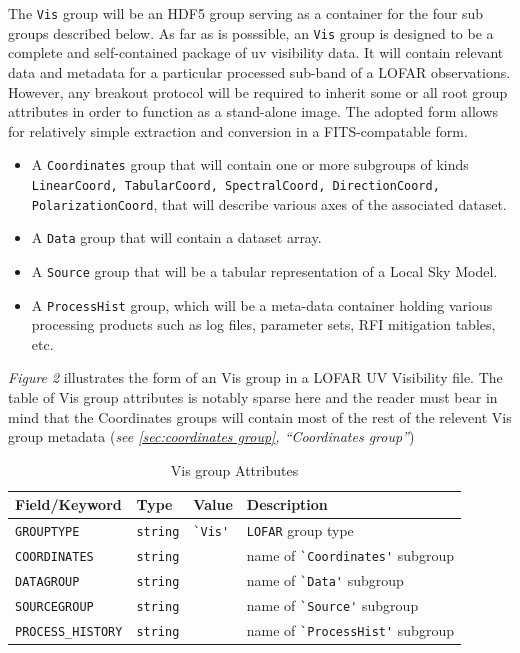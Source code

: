 \documentclass[a4paper,10pt,bibtotoc]{scrartcl}
\begin{document}
The \texttt{Vis} group will be an HDF5 group serving as a container
for the four sub groups described below. As far as is posssible, an
\texttt{Vis} group is designed to be a complete and self-contained
package of uv visibility data.  It will contain relevant data and
metadata for a particular processed sub-band of a LOFAR observations.
However, any breakout protocol will be required to inherit some or all
root group attributes in order to function as a stand-alone image.
The adopted form allows for relatively simple extraction and
conversion in a FITS-compatable form.

\begin{itemize}
\item A \texttt{Coordinates} group that will contain one or more
  subgroups of kinds \texttt{LinearCoord, TabularCoord, SpectralCoord,
    DirectionCoord, PolarizationCoord}, that will describe various
  axes of the associated dataset.
\item A \texttt{Data} group that will contain a dataset array.
\item A \texttt{Source} group that will be a tabular representation of
  a Local Sky Model.
\item A \texttt{ProcessHist} group, which will be a meta-data
  container holding various processing products such as log files,
  parameter sets, RFI mitigation tables, etc.
\end{itemize}

\textit{Figure 2} illustrates the form of an Vis group in a LOFAR UV Visibility file.  The table of Vis group attributes is notably sparse here and the reader must bear in mind that the Coordinates groups will contain most of the rest of the relevent Vis group metadata (\textit{see \ref{sec:coordinates group}, ``Coordinates group''})

\begin{table}[ht]
  \centering
  \begin{tabular}{|llll|}
    \hline
    \sc Field/Keyword & \sc Type & Value &\sc Description \\
    \hline \hline
    \small\verb|GROUPTYPE|       & \verb|string| & \verb|`Vis'| & \small{\texttt{LOFAR}} group type \\
    \small\verb|COORDINATES|     & \verb|string| &   & name of \verb|`Coordinates'| subgroup  \\
    \small\verb|DATAGROUP|       & \verb|string| &   & name of \verb|`Data'| subgroup \\
    \small\verb|SOURCEGROUP|     & \verb|string| &   & name of \verb|`Source'| subgroup \\
    \small\verb|PROCESS_HISTORY| & \verb|string| &   & name of \verb|`ProcessHist'| subgroup \\   
    \hline
  \end{tabular}
  \label{tab:Vis group Attributes}
  \caption{Vis group Attributes}
\end{table}
\end{document}
